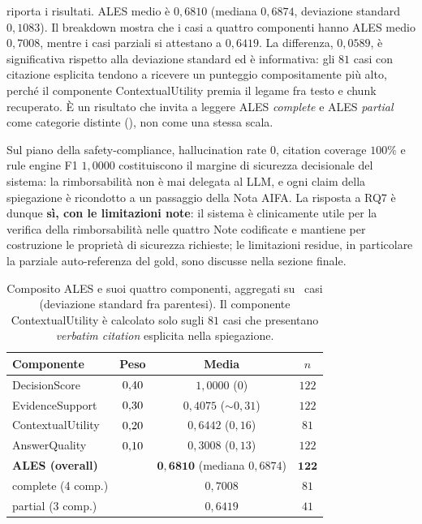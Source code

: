  riporta i risultati. ALES medio è $0{,}6810$ (mediana $0{,}6874$, deviazione standard $0{,}1083$). Il breakdown mostra che i casi a quattro componenti hanno ALES medio $0{,}7008$, mentre i casi parziali si attestano a $0{,}6419$. La differenza, $0{,}0589$, è significativa rispetto alla deviazione standard ed è informativa: gli $81$ casi con citazione esplicita tendono a ricevere un punteggio compositamente più alto, perché il componente ContextualUtility premia il legame fra testo e chunk recuperato. È un risultato che invita a leggere ALES \emph{complete} e ALES \emph{partial} come categorie distinte (), non come una stessa scala.

Sul piano della safety-compliance, hallucination rate $0$, citation coverage $100\%$ e rule engine F1 $1{,}0000$ costituiscono il margine di sicurezza decisionale del sistema: la rimborsabilità non è mai delegata al LLM, e ogni claim della spiegazione è ricondotto a un passaggio della Nota AIFA. La risposta a RQ7 è dunque \textbf{sì, con le limitazioni note}: il sistema è clinicamente utile per la verifica della rimborsabilità nelle quattro Note codificate e mantiene per costruzione le proprietà di sicurezza richieste; le limitazioni residue, in particolare la parziale auto-referenza del gold, sono discusse nella sezione finale.

\begin{table}[t]
  \centering
  \caption{Composito ALES e suoi quattro componenti, aggregati su \goldn\ casi (deviazione standard fra parentesi). Il componente ContextualUtility è calcolato solo sugli $81$ casi che presentano \emph{verbatim citation} esplicita nella spiegazione.}
  \label{tab:ales}
  \small
  \begin{tabular}{lccc}
    \toprule
    Componente & Peso & Media & $n$ \\
    \midrule
    DecisionScore     & $0{,}40$ & $1{,}0000$ ($0$) & $122$ \\
    EvidenceSupport   & $0{,}30$  & $0{,}4075$ ($\sim 0{,}31$) & $122$ \\
    ContextualUtility & $0{,}20$ & $0{,}6442$ ($0{,}16$) & $81$ \\
    AnswerQuality     & $0{,}10$ & $0{,}3008$ ($0{,}13$) & $122$ \\
    \midrule
    \textbf{ALES (overall)} &           & $\mathbf{0{,}6810}$ (mediana $0{,}6874$) & $\mathbf{122}$ \\
    \quad complete (4 comp.) &          & $0{,}7008$ & $81$ \\
    \quad partial (3 comp.)  &          & $0{,}6419$ & $41$ \\
    \bottomrule
  \end{tabular}
\end{table}

